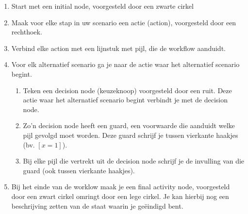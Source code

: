 \begin{enumerate}
	\item Start met een initial node, voorgesteld door een zwarte cirkel
	\item Maak voor elke stap in uw scenario een actie (action), voorgesteld door een rechthoek.
	\item Verbind elke action met een lijnstuk met pijl, die de workflow aanduidt.
	\item Voor elk alternatief scenario ga je naar de actie waar het alternatief scenario begint. 
	\begin{enumerate}
		\item Teken  een decision node (keuzeknoop) voorgesteld door een ruit. Deze actie waar het alternatief scenario begint verbindt je met de decision node.
		\item Zo'n decision node heeft een guard, een voorwaarde die aanduidt welke pijl gevolgd moet worden. Deze guard schrijf je tussen vierkante haakjes (bv. $[x=1]$). 
		\item Bij elke pijl die vertrekt uit de decision node schrijf je de invulling van die guard (ook tussen vierkante haakjes).
	\end{enumerate}
	\item Bij het einde van de worklow maak je een final activity node, voorgesteld door een zwart cirkel omringt door een lege cirkel. Je kan hierbij nog een beschrijving zetten van de staat waarin je ge\"eindigd bent.
\end{enumerate}
